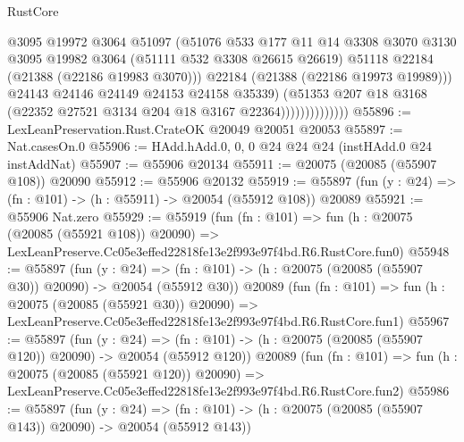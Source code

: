 \begin{lexlean}{RustCore}
\begin{coremodule}
                                @3095
                                @19972
                                @3064
                                @51097
                                (@51076
                                  @533
                                  @177
                                  @11
                                  @14
                                  @3308
                                  @3070
                                  @3130
                                  @3095
                                  @19982
                                  @3064
                                  (@51111 @532 @3308 @26615 @26619)
                                  @51118
                                  @22184
                                  (@21388 (@22186 @19983 @3070)))
                                @22184
                                (@21388 (@22186 @19973 @19989)))
                              @24143
                              @24146
                              @24149
                              @24153
                              @24158
                              @35339)
                            (@51353
                              @207
                              @18
                              @3168
                              (@22352 @27521 @3134 @204 @18 @3167 @22364))))))))))))))
@55896 := LexLeanPreservation.Rust.CrateOK @20049 @20051 @20053
@55897 := Nat.casesOn.{0}
@55906 := HAdd.hAdd.{0, 0, 0} @24 @24 @24 (instHAdd.{0} @24 instAddNat)
@55907 := @55906 @20134
@55911 := @20075 (@20085 (@55907 @108)) @20090
@55912 := @55906 @20132
@55919 := @55897 (fun (y : @24) => (fn : @101) -> (h : @55911) -> @20054 (@55912 @108)) @20089
@55921 := @55906 Nat.zero
@55929 := @55919
    (fun (fn : @101) =>
    fun (h : @20075 (@20085 (@55921 @108)) @20090) =>
    LexLeanPreserve.Cc05e3effed22818fe13e2f993e97f4bd.R6.RustCore.fun0)
@55948 := @55897
    (fun (y : @24) =>
    (fn : @101) -> (h : @20075 (@20085 (@55907 @30)) @20090) -> @20054 (@55912 @30))
    @20089
    (fun (fn : @101) =>
    fun (h : @20075 (@20085 (@55921 @30)) @20090) =>
    LexLeanPreserve.Cc05e3effed22818fe13e2f993e97f4bd.R6.RustCore.fun1)
@55967 := @55897
    (fun (y : @24) =>
    (fn : @101) -> (h : @20075 (@20085 (@55907 @120)) @20090) -> @20054 (@55912 @120))
    @20089
    (fun (fn : @101) =>
    fun (h : @20075 (@20085 (@55921 @120)) @20090) =>
    LexLeanPreserve.Cc05e3effed22818fe13e2f993e97f4bd.R6.RustCore.fun2)
@55986 := @55897
    (fun (y : @24) =>
    (fn : @101) -> (h : @20075 (@20085 (@55907 @143)) @20090) -> @20054 (@55912 @143))

\end{coremodule}
\end{lexlean}
